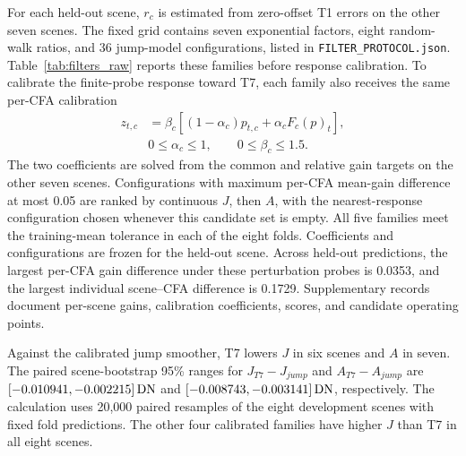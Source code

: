 For each held-out scene, $r_c$ is estimated from zero-offset T1 errors on the other seven scenes. The fixed grid contains seven exponential factors, eight random-walk ratios, and 36 jump-model configurations, listed in \texttt{FILTER\_PROTOCOL.json}. Table~\ref{tab:filters_raw} reports these families before response calibration. To calibrate the finite-probe response toward T7, each family also receives the same per-CFA calibration
\begin{equation}
 \begin{aligned}
 z_{t,c}&=\beta_c[(1-\alpha_c)p_{t,c}+\alpha_cF_c(p)_t],\\
 &0\le\alpha_c\le1,\qquad0\le\beta_c\le1.5.
\end{aligned}
\end{equation}
The two coefficients are solved from the common and relative gain targets on the other seven scenes. Configurations with maximum per-CFA mean-gain difference at most 0.05 are ranked by continuous $J$, then $A$, with the nearest-response configuration chosen whenever this candidate set is empty. All five families meet the training-mean tolerance in each of the eight folds. Coefficients and configurations are frozen for the held-out scene. Across held-out predictions, the largest per-CFA gain difference under these perturbation probes is 0.0353, and the largest individual scene--CFA difference is 0.1729. Supplementary records document per-scene gains, calibration coefficients, scores, and candidate operating points.



Against the calibrated jump smoother, T7 lowers $J$ in six scenes and $A$ in seven. The paired scene-bootstrap 95\% ranges for $J_{T7}-J_{jump}$ and $A_{T7}-A_{jump}$ are $[-0.010941,-0.002215]\,\mathrm{DN}$ and $[-0.008743,-0.003141]\,\mathrm{DN}$, respectively. The calculation uses 20,000 paired resamples of the eight development scenes with fixed fold predictions. The other four calibrated families have higher $J$ than T7 in all eight scenes.

